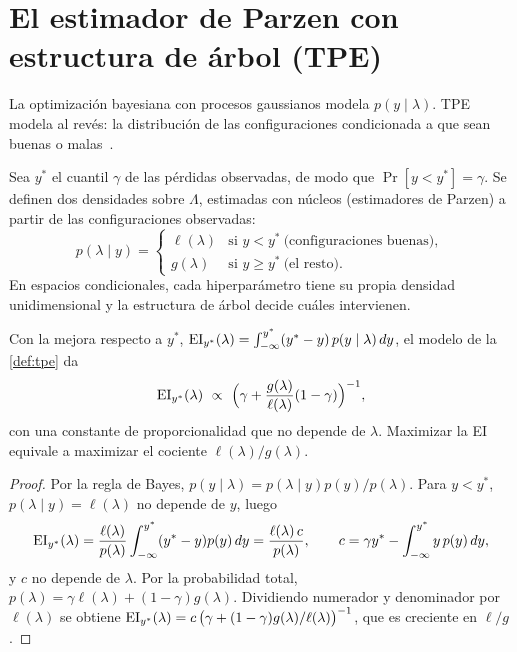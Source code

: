 \section{El estimador de Parzen con estructura de árbol (TPE)}

La optimización bayesiana con procesos gaussianos modela $p(y\mid\lambda)$. TPE modela al revés: la distribución de las configuraciones condicionada a que sean buenas o malas~\cite[§4]{tpe}.

\begin{definicion}[TPE]\label{def:tpe}
Sea $y^*$ el cuantil $\gamma$ de las pérdidas observadas, de modo que $\Pr[y<y^*]=\gamma$. Se definen dos densidades sobre $\Lambda$, estimadas con núcleos (estimadores de Parzen) a partir de las configuraciones observadas:
\[
p(\lambda\mid y)=\begin{cases}\ell(\lambda)&\text{si } y<y^*\ \text{(configuraciones buenas)},\\ g(\lambda)&\text{si } y\ge y^*\ \text{(el resto)}.\end{cases}
\]
En espacios condicionales, cada hiperparámetro tiene su propia densidad unidimensional y la estructura de árbol decide cuáles intervienen.
\end{definicion}

\begin{proposicion}\label{prop:tpe}
Con la mejora respecto a $y^*$, $\operatorname{EI}_{y^*}(\lambda)=\int_{-\infty}^{y^*}(y^*-y)\,p(y\mid\lambda)\,dy$, el modelo de la \cref{def:tpe} da
\[
\EI_{y^*}(\lambda)\ \propto\ \Bigl(\gamma+\frac{g(\lambda)}{\ell(\lambda)}(1-\gamma)\Bigr)^{-1},
\]
con una constante de proporcionalidad que no depende de $\lambda$. Maximizar la EI equivale a maximizar el cociente $\ell(\lambda)/g(\lambda)$.
\end{proposicion}

\begin{proof}
Por la regla de Bayes, $p(y\mid\lambda)=p(\lambda\mid y)p(y)/p(\lambda)$. Para $y<y^*$, $p(\lambda\mid y)=\ell(\lambda)$ no depende de $y$, luego
\[
\operatorname{EI}_{y^*}(\lambda)=\frac{\ell(\lambda)}{p(\lambda)}\int_{-\infty}^{y^*}(y^*-y)p(y)\,dy=\frac{\ell(\lambda)\,c}{p(\lambda)},\qquad c=\gamma y^*-\int_{-\infty}^{y^*}y\,p(y)\,dy,
\]
y $c$ no depende de $\lambda$. Por la probabilidad total, $p(\lambda)=\gamma\ell(\lambda)+(1-\gamma)g(\lambda)$. Dividiendo numerador y denominador por $\ell(\lambda)$ se obtiene $\operatorname{EI}_{y^*}(\lambda)=c\,\bigl(\gamma+(1-\gamma)g(\lambda)/\ell(\lambda)\bigr)^{-1}$, que es creciente en $\ell/g$.
\end{proof}

